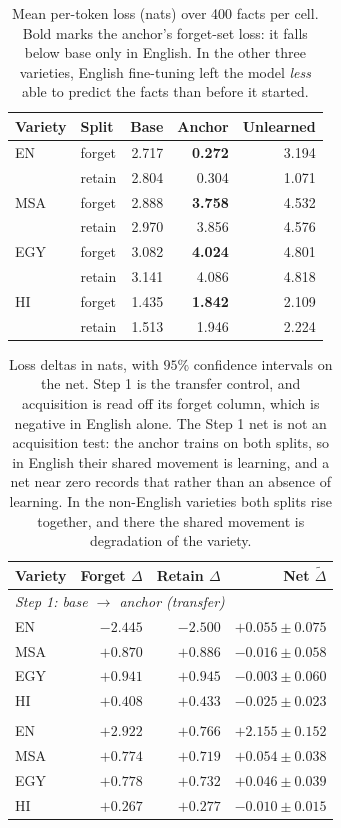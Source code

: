 \documentclass[11pt]{article}
\begin{document}
\begin{table}[t]
\centering
\small
\begin{tabular}{llrrr}
\toprule
Variety & Split & Base & Anchor & Unlearned \\
\midrule
EN  & forget & 2.717 & \textbf{0.272} & 3.194 \\
    & retain & 2.804 & 0.304 & 1.071 \\
\addlinespace
MSA & forget & 2.888 & \textbf{3.758} & 4.532 \\
    & retain & 2.970 & 3.856 & 4.576 \\
\addlinespace
EGY & forget & 3.082 & \textbf{4.024} & 4.801 \\
    & retain & 3.141 & 4.086 & 4.818 \\
\addlinespace
HI  & forget & 1.435 & \textbf{1.842} & 2.109 \\
    & retain & 1.513 & 1.946 & 2.224 \\
\bottomrule
\end{tabular}
\caption{Mean per-token loss (nats) over 400 facts per cell. Bold marks the
anchor's forget-set loss: it falls below base only in English. In the other
three varieties, English fine-tuning left the model \emph{less} able to
predict the facts than before it started.}
\label{tab:losses}
\end{table}

\begin{table}[t]
\centering
\small
\begin{tabular}{lrrr}
\toprule
Variety & Forget $\Delta$ & Retain $\Delta$ & Net $\widetilde{\Delta}$ \\
\midrule
\multicolumn{4}{l}{\emph{Step 1: base $\rightarrow$ anchor (transfer)}} \\
EN  & $-2.445$ & $-2.500$ & $+0.055 \pm 0.075$ \\
MSA & $+0.870$ & $+0.886$ & $-0.016 \pm 0.058$ \\
EGY & $+0.941$ & $+0.945$ & $-0.003 \pm 0.060$ \\
HI  & $+0.408$ & $+0.433$ & $-0.025 \pm 0.023$ \\
\addlinespace
\multicolumn{4}{l}{\emph{Step 2: anchor $\rightarrow$ unlearned}} \\
EN  & $+2.922$ & $+0.766$ & $+2.155 \pm 0.152$ \\
MSA & $+0.774$ & $+0.719$ & $+0.054 \pm 0.038$ \\
EGY & $+0.778$ & $+0.732$ & $+0.046 \pm 0.039$ \\
HI  & $+0.267$ & $+0.277$ & $-0.010 \pm 0.015$ \\
\bottomrule
\end{tabular}
\caption{Loss deltas in nats, with $95\%$ confidence intervals on the net.
Step 1 is the transfer control, and acquisition is read off its forget
column, which is negative in English alone. The Step 1 net is not an
acquisition test: the anchor trains on both splits, so in English their
shared movement is learning, and a net near zero records that rather than an
absence of learning. In the non-English varieties both splits rise together,
and there the shared movement is degradation of the variety.}
\label{tab:deltas}
\end{table}
\end{document}
